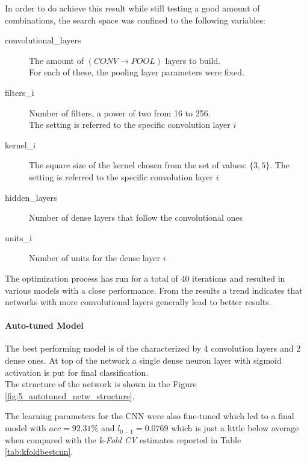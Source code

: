 In order to do achieve this result while still testing a good amount of combinations, the search space
was confined to the following variables:
\begin{description}
    \item [convolutional\_layers] The amount of $(CONV \rightarrow POOL)$ layers to build.\\
    For each of these, the pooling layer parameters were fixed.
    \item[filters\_i] Number of filters, a power of two from 16 to 256.\\
    The setting is referred to the specific convolution layer $i$
    \item[kernel\_i] The square size of the kernel chosen from the set of values: $\{3,5\}$.
    The setting is referred to the specific convolution layer $i$
    \item[hidden\_layers] Number of dense layers that follow the convolutional ones
    \item[units\_i] Number of units for the dense layer $i$
\end{description}

The optimization process has run for a total of 40 iterations and resulted in various models with a close performance.
From the results a trend indicates that networks with more convolutional layers generally lead to better results.

\paragraph{Auto-tuned Model}

The best performing model is of the characterized by 4 convolution layers and 2 dense ones.
At top of the network a single dense neuron layer with sigmoid activation is put for final classification.\\
The structure of the network is shown in the Figure \ref{fig:5_autotuned_netw_structure}.

The learning parameters for the CNN were also fine-tuned which led to a final model with $acc=92.31\%$ and $l_{0-1}=0.0769$
which is just a little below average when compared with the \textit{k-Fold CV} estimates reported in Table \ref{tab:kfoldbestcnn}.

